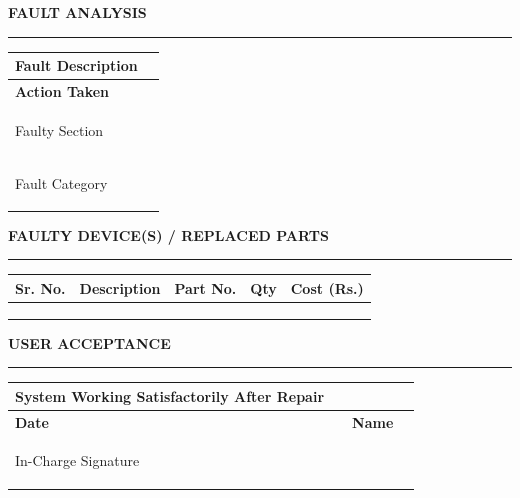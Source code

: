 \documentclass[a4paper,10pt]{article}
\newcommand{\sectiontitle}[1]
{
\vspace{2mm}

{\large\bfseries #1}

\vspace{0.5mm}

\hrule

\vspace{1.5mm}
}
\begin{document}

\sectiontitle{FAULT ANALYSIS}

\begin{tabularx}{\textwidth}{|>{\bfseries}l|X|}
\hline

Fault Description &
\\[5mm]
\hline

Action Taken &
\\[5mm]
\hline

Faulty Section &
\\
\hline

Fault Category &
\\
\hline

\end{tabularx}


\sectiontitle{FAULTY DEVICE(S) / REPLACED PARTS}

\begin{tabularx}{\textwidth}
{|c|X|c|c|c|}
\hline

\textbf{Sr. No.}
&
\textbf{Description}
&
\textbf{Part No.}
&
\textbf{Qty}
&
\textbf{Cost (Rs.)}

\\
\hline

& & & & \\
\hline

& & & & \\
\hline

& & & & \\
\hline

\end{tabularx}


\sectiontitle{USER ACCEPTANCE}

\begin{tabularx}{\textwidth}{|>{\bfseries}l|X|>{\bfseries}l|X|}
\hline

System Working Satisfactorily After Repair &
\multicolumn{3}{l|}{}
\\
\hline

Date &
&
Name &
\\
\hline

In-Charge Signature &
\multicolumn{3}{l|}{}
\\[10mm]
\hline

\end{tabularx}
\end{document}
